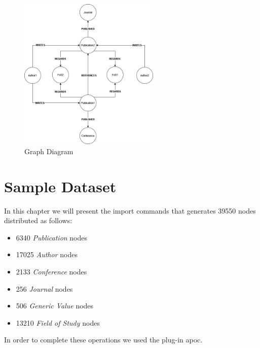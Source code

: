 \documentclass{Configuration_Files/PoliMi3i_thesis}
\begin{document}
\begin{figure}[H]
    \centering
    \includegraphics[width=0.6\textwidth]{graphDiagram.png}
    \caption{Graph Diagram}
    \label{fig:graphDiagram}
\end{figure}

\chapter{Sample Dataset}
In this chapter we will present the import commands that generates 39550 nodes distributed as follows:
\begin{itemize}
    \item 6340 \emph{Publication} nodes
    \item 17025 \emph{Author} nodes
    \item 2133 \emph{Conference} nodes
    \item 256 \emph{Journal} nodes
    \item 506 \emph{Generic Value} nodes
    \item 13210 \emph{Field of Study} nodes
\end{itemize}
In order to complete these operations we used the plug-in apoc.
\end{document}
